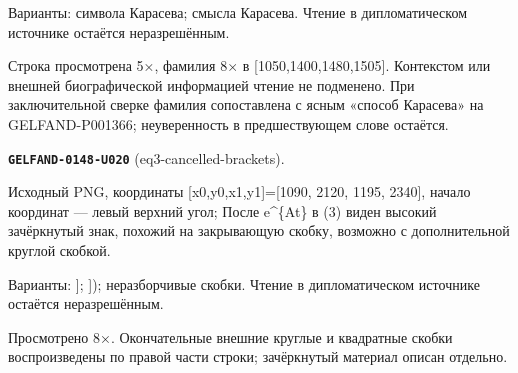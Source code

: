\documentclass[11pt]{article}
\theoremstyle{definition}
\theoremstyle{remark}
\begin{document}
Варианты: символа Карасева; смысла Карасева. Чтение в дипломатическом источнике остаётся неразрешённым.\par
Строка просмотрена 5×, фамилия 8× в [1050,1400,1480,1505]. Контекстом или внешней биографической информацией чтение не подменено. При заключительной сверке фамилия сопоставлена с ясным «способ Карасева» на GELFAND-P001366; неуверенность в предшествующем слове остаётся.\par\medskip
\noindent\leavevmode{}\label{GELFAND-P001363:eq3-cancelled-brackets:note}\textbf{\texttt{GELFAND-0148-U020}} (eq3-cancelled-brackets).\par\nopagebreak[4]
Исходный PNG, координаты [x0,y0,x1,y1]=[1090, 2120, 1195, 2340], начало координат — левый верхний угол; После e\textasciicircum{}\{At\} в (3) виден высокий зачёркнутый знак, похожий на закрывающую скобку, возможно с дополнительной круглой скобкой.\par
Варианты: ]; ]); неразборчивые скобки. Чтение в дипломатическом источнике остаётся неразрешённым.\par
Просмотрено 8×. Окончательные внешние круглые и квадратные скобки воспроизведены по правой части строки; зачёркнутый материал описан отдельно.\par\medskip
\end{document}
